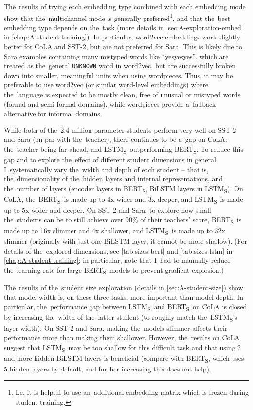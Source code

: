 \documentclass[bsc,frontabs,singlespacing,parskip,deptreport]{infthesis}
\def\BERTS{BERT\textsubscript{S}}
\def\LSTMS{LSTM\textsubscript{S}}
\begin{document}
{{    The~results of trying each embedding type combined with each embedding mode show that the~multichannel mode is generally preferred\footnote{I.e. it is helpful to use an~additional embedding matrix which is frozen during student training.}, and that the~best embedding type depends on the~task (more details in \autoref{sec:A-exploration-embed} in \autoref{chap:A-student-training}). 
    In particular, word2vec embeddings work slightly better for CoLA and SST-2, but are not preferred for Sara. This is likely due to Sara examples containing many mistyped words like ``yesyesyes'', which are treated as the~general \verb|UNKNOWN| word in word2vec, but are successfully broken down into smaller, meaningful units when using wordpieces. Thus, it may be preferable to use word2vec (or similar word-level embeddings) where the~language is expected to be mostly clean, free of unusual or mistyped words (formal and semi-formal domains), while wordpieces provide a~fallback alternative for informal domains.

    While both of the~2.4-million parameter students perform very well on SST-2 and Sara (on par with the~teacher), there continues to be a~gap on CoLA: the~teacher being far ahead, and \LSTMS~outperforming \BERTS.
    To reduce this gap and to explore the~effect of different student dimensions in general, I~systematically vary the~width and depth of each student -- that is, the~dimensionality of the~hidden layers and internal representations, and the~number of layers (encoder layers in \BERTS, BiLSTM layers in \LSTMS).
    On CoLA, the~\BERTS~is made up to 4x wider and 3x deeper, and \LSTMS~is made up to 5x wider and deeper. On SST-2 and Sara, to explore how small the~students can be to still achieve over 90\% of their teachers' score, \BERTS~is made up to 16x slimmer and 4x shallower, and \LSTMS~is made up to 32x slimmer (originally with just one BiLSTM layer, it cannot be more shallow). (For details of the~explored dimensions, see \autoref{tab:sizes-bert} and \autoref{tab:sizes-lstm} in \autoref{chap:A-student-training}; in particular, note that I~had to manually reduce the~learning rate for large \BERTS~models to prevent gradient explosion.)

    The~results of the~student size exploration (details in \autoref{sec:A-student-size}) show that model width is, on these three tasks, more important than model depth. In particular, the~performance gap between \LSTMS~and \BERTS~on CoLA is closed by increasing the~width of the~latter student (to roughly match the~\LSTMS's layer width). On SST-2 and Sara, making the~models slimmer affects their performance more than making them shallower. However, the~results on CoLA suggest that \LSTMS~may be too shallow for this difficult task and that using 2 and more hidden BiLSTM layers is beneficial (compare with \BERTS, which uses 5 hidden layers by default, and further increasing this does not help).
  }

}
\end{document}

